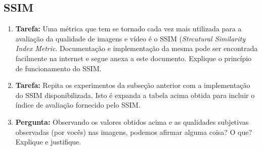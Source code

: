 \documentclass[11pt]{article}
\begin{document}
\subsection{SSIM}

\begin{enumerate}

\item \textbf{Tarefa:} Uma métrica que tem se tornado cada vez mais utilizada para a avaliação da qualidade de imagens e vídeo é o SSIM (\emph{Strcutural Similarity Index Metric}. Documentação e implementação da mesma pode ser encontrada facilmente na internet e %
segue anexa a este documento. Explique o princípio de funcionamento do SSIM.

\item \textbf{Tarefa:} Repita os experimentos da subseção anterior com a implementação do SSIM disponibilizada. Isto é expanda a tabela acima obtida para incluir o índice de avaliação fornecido pelo SSIM.

\item \textbf{Pergunta:} Observando os valores obtidos acima e as qualidades subjetivas observadas (por vocês) nas imagens, podemos afirmar alguma coisa? O que? Explique e justifique.

\end{enumerate}
\end{document}
